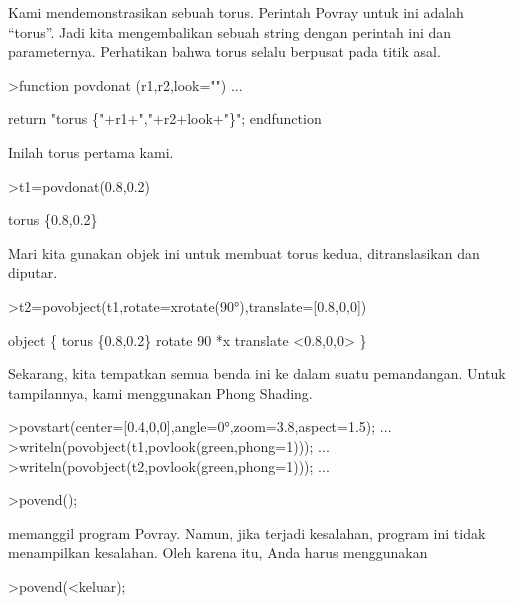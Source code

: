 \documentclass[a4paper,10pt]{article}
\begin{document}
\begin{eulernotebook}
\begin{eulercomment}
Kami mendemonstrasikan sebuah torus. Perintah Povray untuk ini adalah
“torus”. Jadi kita mengembalikan sebuah string dengan perintah ini dan
parameternya. Perhatikan bahwa torus selalu berpusat pada titik asal.
\end{eulercomment}
\begin{eulerprompt}
>function povdonat (r1,r2,look="") ...
\end{eulerprompt}
\begin{eulerudf}
    return "torus \{"+r1+","+r2+look+"\}";
  endfunction
\end{eulerudf}
\begin{eulercomment}
Inilah torus pertama kami.
\end{eulercomment}
\begin{eulerprompt}
>t1=povdonat(0.8,0.2)
\end{eulerprompt}
\begin{euleroutput}
  torus \{0.8,0.2\}
\end{euleroutput}
\begin{eulercomment}
Mari kita gunakan objek ini untuk membuat torus kedua, ditranslasikan
dan diputar.
\end{eulercomment}
\begin{eulerprompt}
>t2=povobject(t1,rotate=xrotate(90°),translate=[0.8,0,0])
\end{eulerprompt}
\begin{euleroutput}
  object \{ torus \{0.8,0.2\}
   rotate 90 *x 
   translate <0.8,0,0>
   \}
\end{euleroutput}
\begin{eulercomment}
Sekarang, kita tempatkan semua benda ini ke dalam suatu pemandangan.
Untuk tampilannya, kami menggunakan Phong Shading.
\end{eulercomment}
\begin{eulerprompt}
>povstart(center=[0.4,0,0],angle=0°,zoom=3.8,aspect=1.5); ...
>writeln(povobject(t1,povlook(green,phong=1))); ...
>writeln(povobject(t2,povlook(green,phong=1))); ...
\end{eulerprompt}
\begin{eulerttcomment}
 >povend();
\end{eulerttcomment}
\begin{eulercomment}
memanggil program Povray. Namun, jika terjadi kesalahan, program ini
tidak menampilkan kesalahan. Oleh karena itu, Anda harus menggunakan

\end{eulercomment}
\begin{eulerttcomment}
 >povend(<keluar);
\end{eulerttcomment}
\begin{eulercomment}


\end{eulercomment}
\end{eulernotebook}
\end{document}
